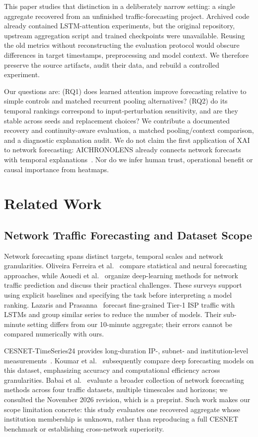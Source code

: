 \documentclass[conference]{IEEEtran}
\begin{document}
This paper studies that distinction in a deliberately narrow setting: a single aggregate recovered from an unfinished traffic-forecasting project. Archived code already contained LSTM-attention experiments, but the original repository, upstream aggregation script and trained checkpoints were unavailable. Reusing the old metrics without reconstructing the evaluation protocol would obscure differences in target timestamps, preprocessing and model context. We therefore preserve the source artifacts, audit their data, and rebuild a controlled experiment.

Our questions are: (RQ1) does learned attention improve forecasting relative to simple controls and matched recurrent pooling alternatives? (RQ2) do its temporal rankings correspond to input-perturbation sensitivity, and are they stable across seeds and replacement choices? We contribute a documented recovery and continuity-aware evaluation, a matched pooling/context comparison, and a diagnostic explanation audit. We do not claim the first application of XAI to network forecasting: AICHRONOLENS already connects network forecasts with temporal explanations~\cite{aichronolens}. Nor do we infer human trust, operational benefit or causal importance from heatmaps.

\section{Related Work}
\subsection{Network Traffic Forecasting and Dataset Scope}
Network forecasting spans distinct targets, temporal scales and network granularities. Oliveira Ferreira et al.~\cite{survey} compare statistical and neural forecasting approaches, while Aouedi et al.~\cite{ntp_survey} organize deep-learning methods for network traffic prediction and discuss their practical challenges. These surveys support using explicit baselines and specifying the task before interpreting a model ranking. Lazaris and Prasanna~\cite{network_lstm} forecast fine-grained Tier-1 ISP traffic with LSTMs and group similar series to reduce the number of models. Their sub-minute setting differs from our 10-minute aggregate; their errors cannot be compared numerically with ours.

CESNET-TimeSeries24 provides long-duration IP-, subnet- and institution-level measurements~\cite{cesnet}. Koumar et al.~\cite{cesnet_comparison} subsequently compare deep forecasting models on this dataset, emphasizing accuracy and computational efficiency across granularities. Babai et al.~\cite{which_deep} evaluate a broader collection of network forecasting methods across four traffic datasets, multiple timescales and horizons; we consulted the November 2026 revision, which is a preprint. Such work makes our scope limitation concrete: this study evaluates one recovered aggregate whose institution membership is unknown, rather than reproducing a full CESNET benchmark or establishing cross-network superiority.
\end{document}
